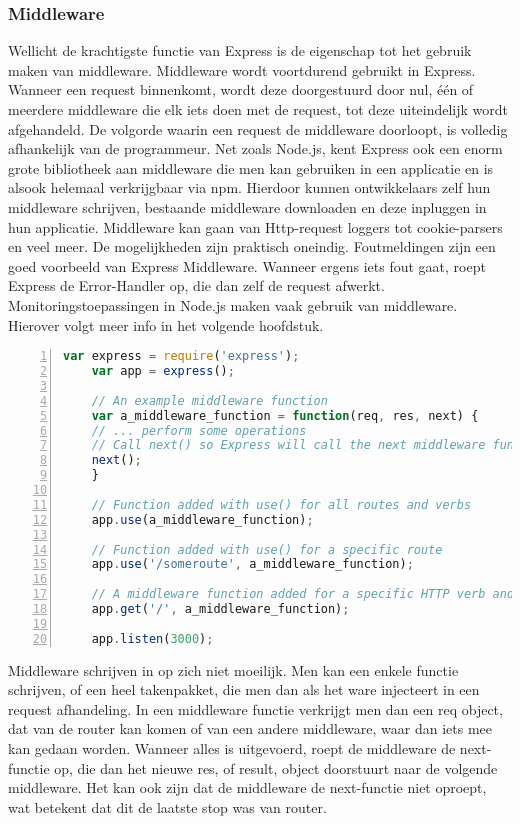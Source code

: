 \subsubsection{Middleware}
\label{sec:expressMiddleware}

Wellicht de krachtigste functie van Express is de eigenschap tot het gebruik maken van middleware. Middleware wordt voortdurend gebruikt in Express. Wanneer een request binnenkomt, wordt deze doorgestuurd door nul, één of meerdere middleware die elk iets doen met de request, tot deze uiteindelijk wordt afgehandeld. De volgorde waarin een request de middleware doorloopt, is volledig afhankelijk van de programmeur. Net zoals Node.js, kent Express ook een enorm grote bibliotheek aan middleware die men kan gebruiken in een applicatie en is alsook helemaal verkrijgbaar via npm. Hierdoor kunnen ontwikkelaars zelf hun middleware schrijven, bestaande middleware downloaden en deze inpluggen in hun applicatie. Middleware kan gaan van Http-request loggers tot cookie-parsers en veel meer. De mogelijkheden zijn praktisch oneindig. Foutmeldingen zijn een goed voorbeeld van Express Middleware. Wanneer ergens iets fout gaat, roept Express de Error-Handler op, die dan zelf de request afwerkt. Monitoringstoepassingen in Node.js maken vaak gebruik van middleware. Hierover volgt meer info in het volgende hoofdstuk.

	\begin{lstlisting}[language=JavaScript, breaklines=true,
						numbers=left, frame=single,
						caption={Express code flow voorbeeld.},
						label=code:expressexample]
	var express = require('express');
	var app = express();
	
	// An example middleware function
	var a_middleware_function = function(req, res, next) {
	// ... perform some operations
	// Call next() so Express will call the next middleware function in the chain.
	next();
	}
	
	// Function added with use() for all routes and verbs
	app.use(a_middleware_function);
	
	// Function added with use() for a specific route
	app.use('/someroute', a_middleware_function);
	
	// A middleware function added for a specific HTTP verb and route
	app.get('/', a_middleware_function);
	
	app.listen(3000);
	\end{lstlisting}
	
	
Middleware schrijven in op zich niet moeilijk. Men kan een enkele functie schrijven, of een heel takenpakket, die men dan als het ware injecteert in een request afhandeling. In een middleware functie verkrijgt men dan een req object, dat van de router kan komen of van een andere middleware, waar dan iets mee kan gedaan worden. Wanneer alles is uitgevoerd, roept de middleware de next-functie op, die dan het nieuwe res, of result, object doorstuurt naar de volgende middleware. Het kan ook zijn dat de middleware de next-functie niet oproept, wat betekent dat dit de laatste stop was van router. 


